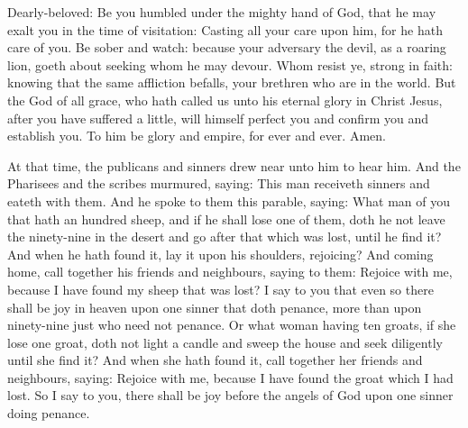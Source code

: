
Dearly-beloved: Be you humbled under the mighty hand of God, that he may exalt you in
the time of visitation: Casting all your care upon him, for he hath care of
you.  Be sober and watch: because your adversary the devil, as a roaring lion,
goeth about seeking whom he may devour.  Whom resist ye, strong in faith:
knowing that the same affliction befalls, your brethren who are in the world.
But the God of all grace, who hath called us unto his eternal glory in Christ
Jesus, after you have suffered a little, will himself perfect you and confirm
you and establish you.  To him be glory and empire, for ever and ever. Amen.



At that time, the publicans and sinners drew near unto him to hear him.  And the
Pharisees and the scribes murmured, saying: This man receiveth sinners and
eateth with them.  And he spoke to them this parable, saying: What man of you
that hath an hundred sheep, and if he shall lose one of them, doth he not leave
the ninety-nine in the desert and go after that which was lost, until he find
it?  And when he hath found it, lay it upon his shoulders, rejoicing?  And
coming home, call together his friends and neighbours, saying to them: Rejoice
with me, because I have found my sheep that was lost?  I say to you that even
so there shall be joy in heaven upon one sinner that doth penance, more than
upon ninety-nine just who need not penance.  Or what woman having ten groats,
if she lose one groat, doth not light a candle and sweep the house and seek
diligently until she find it?  And when she hath found it, call together her
friends and neighbours, saying: Rejoice with me, because I have found the groat
which I had lost.  So I say to you, there shall be joy before the angels of God
upon one sinner doing penance.







